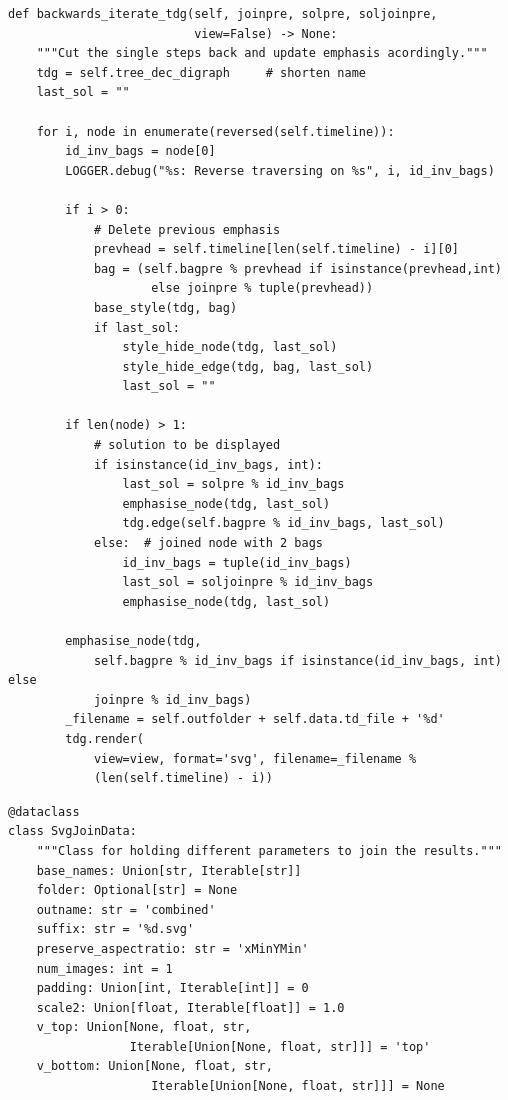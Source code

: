 \documentclass[a4paper, 12pt, bibliography=totoc]{scrartcl}
\begin{document}
\begin{lstlisting}[style=custompy, caption={backwards\_iterate\_tdg}, label={lst:backward-iterate}]
def backwards_iterate_tdg(self, joinpre, solpre, soljoinpre,
                          view=False) -> None:
	"""Cut the single steps back and update emphasis acordingly."""
	tdg = self.tree_dec_digraph     # shorten name
	last_sol = ""
	
	for i, node in enumerate(reversed(self.timeline)):
		id_inv_bags = node[0]
		LOGGER.debug("%s: Reverse traversing on %s", i, id_inv_bags)
		
		if i > 0:
			# Delete previous emphasis
			prevhead = self.timeline[len(self.timeline) - i][0]
			bag = (self.bagpre % prevhead if isinstance(prevhead,int) 
					else joinpre % tuple(prevhead))
			base_style(tdg, bag)
			if last_sol:
				style_hide_node(tdg, last_sol)
				style_hide_edge(tdg, bag, last_sol)
				last_sol = ""
		
		if len(node) > 1:
			# solution to be displayed
			if isinstance(id_inv_bags, int):
				last_sol = solpre % id_inv_bags
				emphasise_node(tdg, last_sol)
				tdg.edge(self.bagpre % id_inv_bags, last_sol)
			else:  # joined node with 2 bags
				id_inv_bags = tuple(id_inv_bags)
				last_sol = soljoinpre % id_inv_bags
				emphasise_node(tdg, last_sol)
			
		emphasise_node(tdg,
			self.bagpre % id_inv_bags if isinstance(id_inv_bags, int) else 
			joinpre % id_inv_bags)
		_filename = self.outfolder + self.data.td_file + '%d'
		tdg.render(
			view=view, format='svg', filename=_filename %
			(len(self.timeline) - i))

\end{lstlisting}

\begin{lstlisting}[style=custompy, caption={SvgJoinData}, label={lst:svgjoindata}]
@dataclass
class SvgJoinData:
	"""Class for holding different parameters to join the results."""
	base_names: Union[str, Iterable[str]]
	folder: Optional[str] = None
	outname: str = 'combined'
	suffix: str = '%d.svg'
	preserve_aspectratio: str = 'xMinYMin'
	num_images: int = 1
	padding: Union[int, Iterable[int]] = 0
	scale2: Union[float, Iterable[float]] = 1.0
	v_top: Union[None, float, str, 
	             Iterable[Union[None, float, str]]] = 'top'
	v_bottom: Union[None, float, str, 
	                Iterable[Union[None, float, str]]] = None
\end{lstlisting}

\end{document}
